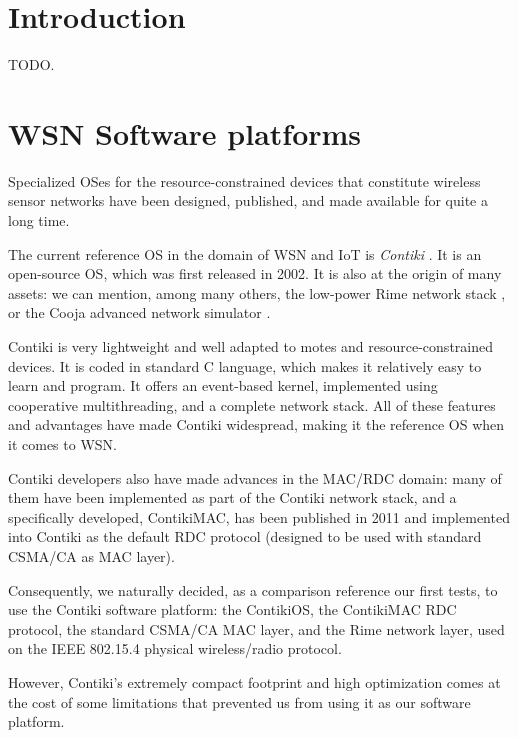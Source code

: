 \documentclass[conference]{IEEEtran}
\begin{document}
\IEEEpeerreviewmaketitle



\section{Introduction}

TODO.



\section{WSN Software platforms}

Specialized OSes for the resource-constrained devices that constitute
wireless sensor networks have been designed, published, and made available
for quite a long time.


The current reference OS in the domain of WSN and IoT is \emph{Contiki}
\cite{ContikiOS}. It is an open-source OS, which was first released
in 2002. It is also at the origin of many assets: we can mention, among
many others, the low-power Rime network stack \cite{Rime}, or the Cooja
advanced network simulator \cite{Cooja}.

Contiki is very lightweight and well adapted to motes and
resource-constrained devices. It is coded in standard C language, which
makes it relatively easy to learn and program. It offers an event-based
kernel, implemented using cooperative multithreading, and a complete
network stack. All of these features and advantages have made
Contiki widespread, making it the reference OS when it comes to WSN.

Contiki developers also have made advances in the MAC/RDC domain: many
of them have been implemented as part of the Contiki network stack, and
a specifically developed, ContikiMAC, has been published in 2011
\cite{ContikiMAC} and implemented into Contiki as the default
RDC protocol (designed to be used with standard CSMA/CA as MAC layer).

Consequently, we naturally decided, as a comparison reference our first tests,
to use the Contiki software platform: the ContikiOS, the ContikiMAC RDC
protocol, the standard CSMA/CA MAC layer, and the Rime network layer, used
on the IEEE 802.15.4 physical wireless/radio protocol.

\bigskip

However, Contiki's extremely compact footprint and high optimization comes
at the cost of some limitations that prevented us from using it as our
software platform.
\end{document}
